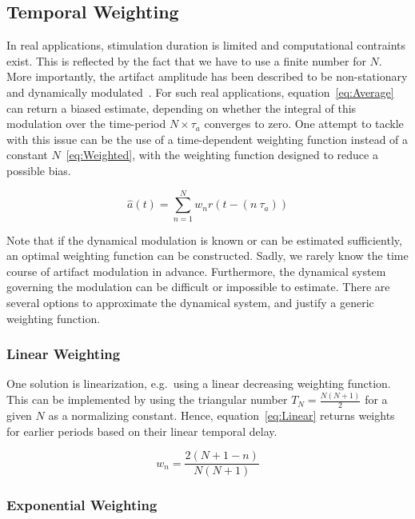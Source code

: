 \documentclass[a4paper]{article}
\begin{document}
\subsection{Temporal Weighting}

In real applications, stimulation duration is limited and computational contraints exist. This is reflected by the fact that we have to use a finite number for $N$. More importantly, the artifact amplitude has been described to be non-stationary  and dynamically modulated~\citep{Noury_2016}.
For such real applications, equation~\eqref{eq:Average} can return a biased estimate, depending on whether the integral of this modulation over the time-period $N\times\tau_a$ converges to zero.
One attempt to tackle with this issue can be the use of a time-dependent weighting function instead of a constant $N$~\eqref{eq:Weighted}, with the weighting function designed to reduce a possible bias.

\begin{equation}
    \hat{a}(t) = \sum_{n=1}^{N} w_n r(t - (n~\tau_a))\label{eq:Weighted}
\end{equation}

Note that if the dynamical modulation is known or can be estimated sufficiently, an optimal weighting function can be constructed. Sadly, we rarely know the time course of artifact modulation in advance. Furthermore, the dynamical system governing the modulation can be difficult or impossible to estimate. There are several options to approximate the dynamical system, and justify a generic weighting function.

\subsubsection{Linear Weighting}

One solution is linearization, e.g.\ using a linear decreasing weighting function. This can be implemented by using the triangular number $T_N = \frac{N(N+1)}{2}$ for a given $N$ as a normalizing constant. Hence, equation~\eqref{eq:Linear} returns weights for earlier periods based on their linear temporal delay.

\begin{equation}
    w_n = \frac{2(N+1-n)}{N(N+1)}\label{eq:Linear}
\end{equation}

\subsubsection{Exponential Weighting}
\end{document}
